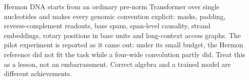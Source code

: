 Hermon DNA starts from an ordinary pre-norm Transformer over single nucleotides and makes every genomic convention explicit: masks, padding, reverse-complement readouts, base spans, span-level causality, strand embeddings, rotary positions in base units and long-context access graphs. The pilot experiment is reported as it came out: under its small budget, the Hermon reference did not fit the task while a four-wide convolution partly did. Treat this as a lesson, not an embarrassment. Correct algebra and a trained model are different achievements.
